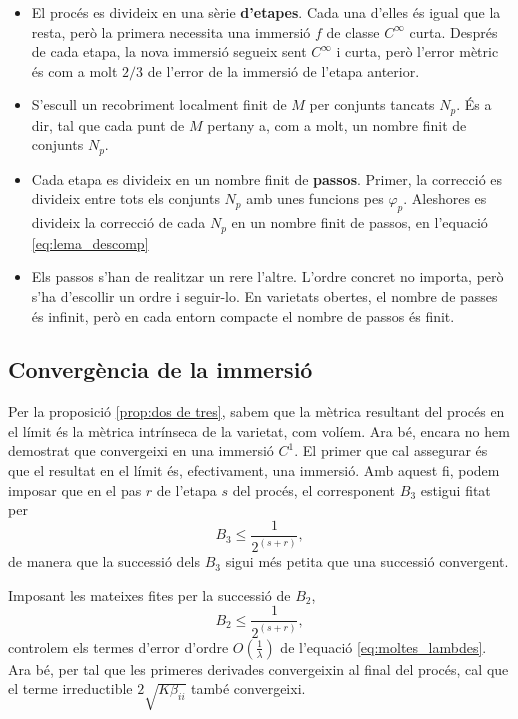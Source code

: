\begin{itemize}
    \item El procés es divideix en una sèrie \textbf{d'etapes}. Cada una d'elles és igual que la resta, però la primera necessita una immersió $f$ de classe $C^\infty$ curta. Després de cada etapa, la nova immersió segueix sent $C^\infty$ i curta, però l'error mètric és com a molt $2/3$ de l'error de la immersió de l'etapa anterior.
    \item S'escull un recobriment localment finit de $M$ per conjunts tancats $N_p$. És a dir, tal que cada punt de $M$ pertany a, com a molt, un nombre finit de conjunts $N_p$.
    \item Cada etapa es divideix en un nombre finit de \textbf{passos}. Primer, la correcció es divideix entre tots els conjunts $N_p$ amb unes funcions pes $\varphi_p$. Aleshores es divideix la correcció de cada $N_p$ en un nombre finit de passos, en l'equació \ref{eq:lema_descomp}
    \item Els passos s'han de realitzar un rere l'altre. L'ordre concret no importa, però s'ha d'escollir un ordre i seguir-lo. En varietats obertes, el nombre de passes és infinit, però en cada entorn compacte el nombre de passos és finit.
\end{itemize}

\subsection{Convergència de la immersió}
Per la proposició \ref{prop:dos de tres}, sabem que la mètrica resultant del procés en el límit és la mètrica intrínseca de la varietat, com volíem. Ara bé, encara no hem demostrat que convergeixi en una immersió $C^1$. El primer que cal assegurar és que el resultat en el límit és, efectivament, una immersió. Amb aquest fi, podem imposar que en el pas $r$ de l'etapa $s$ del procés, el corresponent $B_3$ estigui fitat per
\begin{equation}\label{eq:b3_cota}
    B_{3} \le \frac1{2^{(s+r)}},
\end{equation}
de manera que la successió dels $B_3$ sigui més petita que una successió convergent.

Imposant les mateixes fites per la successió de $B_2$, 
\begin{equation}
    B_2 \le \frac1{2^{(s+r)}},
\end{equation}
controlem els termes d'error d'ordre $O\left(\frac1{\lambda}\right)$ de l'equació \ref{eq:moltes_lambdes}. Ara bé, per tal que les primeres derivades convergeixin al final del procés, cal que el terme irreductible $2\sqrt{K\beta_{ii}}$ també convergeixi.

